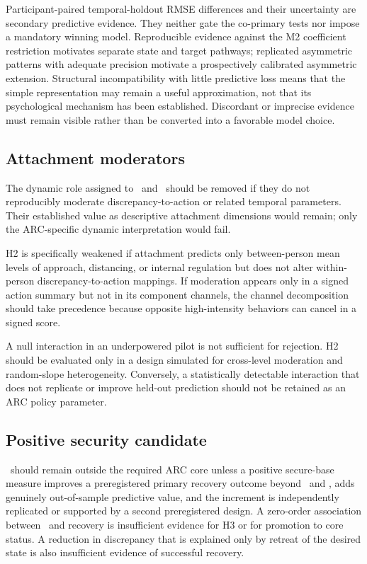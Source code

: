 Participant-paired temporal-holdout RMSE differences and their uncertainty are secondary predictive evidence. They neither gate the co-primary tests nor impose a mandatory winning model. Reproducible evidence against the M2 coefficient restriction motivates separate state and target pathways; replicated asymmetric patterns with adequate precision motivate a prospectively calibrated asymmetric extension. Structural incompatibility with little predictive loss means that the simple representation may remain a useful approximation, not that its psychological mechanism has been established. Discordant or imprecise evidence must remain visible rather than be converted into a favorable model choice.

\subsection{Attachment moderators}

The dynamic role assigned to \Anx\ and \Avo\ should be removed if they do not reproducibly moderate discrepancy-to-action or related temporal parameters. Their established value as descriptive attachment dimensions would remain; only the ARC-specific dynamic interpretation would fail.

H2 is specifically weakened if attachment predicts only between-person mean levels of approach, distancing, or internal regulation but does not alter within-person discrepancy-to-action mappings. If moderation appears only in a signed action summary but not in its component channels, the channel decomposition should take precedence because opposite high-intensity behaviors can cancel in a signed score.

A null interaction in an underpowered pilot is not sufficient for rejection. H2 should be evaluated only in a design simulated for cross-level moderation and random-slope heterogeneity. Conversely, a statistically detectable interaction that does not replicate or improve held-out prediction should not be retained as an ARC policy parameter.

\subsection{Positive security candidate}

\Sec\ should remain outside the required ARC core unless a positive secure-base measure improves a preregistered primary recovery outcome beyond \Anx\ and \Avo, adds genuinely out-of-sample predictive value, and the increment is independently replicated or supported by a second preregistered design. A zero-order association between \Sec\ and recovery is insufficient evidence for H3 or for promotion to core status. A reduction in discrepancy that is explained only by retreat of the desired state is also insufficient evidence of successful recovery.

